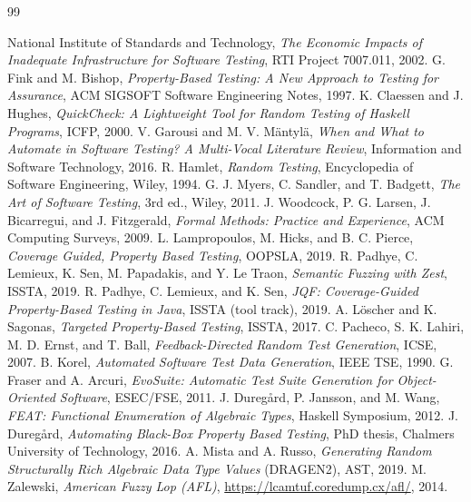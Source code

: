 \documentclass[11pt,a4paper]{report}
\begin{document}
\begin{thebibliography}{99}

 National Institute of Standards and Technology, \emph{The Economic Impacts of Inadequate Infrastructure for Software Testing}, RTI Project 7007.011, 2002.
 G. Fink and M. Bishop, \emph{Property-Based Testing: A New Approach to Testing for Assurance}, ACM SIGSOFT Software Engineering Notes, 1997.
 K. Claessen and J. Hughes, \emph{QuickCheck: A Lightweight Tool for Random Testing of Haskell Programs}, ICFP, 2000.
 V. Garousi and M. V. M\"antyl\"a, \emph{When and What to Automate in Software Testing? A Multi-Vocal Literature Review}, Information and Software Technology, 2016.
 R. Hamlet, \emph{Random Testing}, Encyclopedia of Software Engineering, Wiley, 1994.
 G. J. Myers, C. Sandler, and T. Badgett, \emph{The Art of Software Testing}, 3rd ed., Wiley, 2011.
 J. Woodcock, P. G. Larsen, J. Bicarregui, and J. Fitzgerald, \emph{Formal Methods: Practice and Experience}, ACM Computing Surveys, 2009.
 L. Lampropoulos, M. Hicks, and B. C. Pierce, \emph{Coverage Guided, Property Based Testing}, OOPSLA, 2019.
 R. Padhye, C. Lemieux, K. Sen, M. Papadakis, and Y. Le Traon, \emph{Semantic Fuzzing with Zest}, ISSTA, 2019.
 R. Padhye, C. Lemieux, and K. Sen, \emph{JQF: Coverage-Guided Property-Based Testing in Java}, ISSTA (tool track), 2019.
 A. L\"oscher and K. Sagonas, \emph{Targeted Property-Based Testing}, ISSTA, 2017.
 C. Pacheco, S. K. Lahiri, M. D. Ernst, and T. Ball, \emph{Feedback-Directed Random Test Generation}, ICSE, 2007.
 B. Korel, \emph{Automated Software Test Data Generation}, IEEE TSE, 1990.
 G. Fraser and A. Arcuri, \emph{EvoSuite: Automatic Test Suite Generation for Object-Oriented Software}, ESEC/FSE, 2011.
 J. Dureg\aa rd, P. Jansson, and M. Wang, \emph{FEAT: Functional Enumeration of Algebraic Types}, Haskell Symposium, 2012.
 J. Dureg\aa rd, \emph{Automating Black-Box Property Based Testing}, PhD thesis, Chalmers University of Technology, 2016.
 A. Mista and A. Russo, \emph{Generating Random Structurally Rich Algebraic Data Type Values} (DRAGEN2), AST, 2019.
 M. Zalewski, \emph{American Fuzzy Lop (AFL)}, \url{https://lcamtuf.coredump.cx/afl/}, 2014.

\end{thebibliography}
\end{document}
